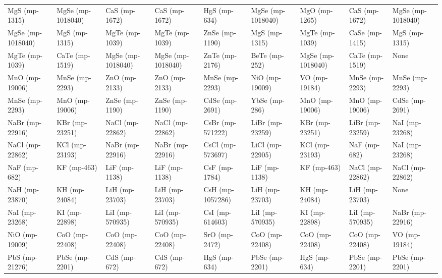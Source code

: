 \begin{longtable}{lllllllll}
    MgS (mp-1315) & MgSe (mp-1018040) &       CaS (mp-1672) &     CaS (mp-1672) &        HgS (mp-634) & MgSe (mp-1018040) &     MgO (mp-1265) &     CaS (mp-1672) & MgSe (mp-1018040) \\
MgSe (mp-1018040) &     MgS (mp-1315) &      MgTe (mp-1039) &    MgTe (mp-1039) &      ZnSe (mp-1190) &     MgS (mp-1315) &    MgTe (mp-1039) &    CaSe (mp-1415) &     MgS (mp-1315) \\
   MgTe (mp-1039) &    CaTe (mp-1519) &   MgSe (mp-1018040) & MgSe (mp-1018040) &      ZnTe (mp-2176) &     BeTe (mp-252) & MgSe (mp-1018040) &    CaTe (mp-1519) &              None \\
   MnO (mp-19006) &    MnSe (mp-2293) &       ZnO (mp-2133) &     ZnO (mp-2133) &      MnSe (mp-2293) &    NiO (mp-19009) &     VO (mp-19184) &    MnSe (mp-2293) &    MnSe (mp-2293) \\
   MnSe (mp-2293) &    MnO (mp-19006) &      ZnSe (mp-1190) &    ZnSe (mp-1190) &      CdSe (mp-2691) &     YbSe (mp-286) &    MnO (mp-19006) &    MnO (mp-19006) &    CdSe (mp-2691) \\
  NaBr (mp-22916) &    KBr (mp-23251) &     NaCl (mp-22862) &   NaCl (mp-22862) &    CsBr (mp-571222) &   LiBr (mp-23259) &    KBr (mp-23251) &   LiBr (mp-23259) &    NaI (mp-23268) \\
  NaCl (mp-22862) &    KCl (mp-23193) &     NaBr (mp-22916) &   NaBr (mp-22916) &    CsCl (mp-573697) &   LiCl (mp-22905) &    KCl (mp-23193) &      NaF (mp-682) &    NaI (mp-23268) \\
     NaF (mp-682) &       KF (mp-463) &       LiF (mp-1138) &     LiF (mp-1138) &       CsF (mp-1784) &     LiF (mp-1138) &       KF (mp-463) &   NaCl (mp-22862) &   NaCl (mp-22862) \\
   NaH (mp-23870) &     KH (mp-24084) &      LiH (mp-23703) &    LiH (mp-23703) &    CsH (mp-1057286) &    LiH (mp-23703) &     KH (mp-24084) &    LiH (mp-23703) &              None \\
   NaI (mp-23268) &     KI (mp-22898) &     LiI (mp-570935) &   LiI (mp-570935) &     CsI (mp-614603) &   LiI (mp-570935) &     KI (mp-22898) &   LiI (mp-570935) &   NaBr (mp-22916) \\
   NiO (mp-19009) &    CoO (mp-22408) &      CoO (mp-22408) &    CoO (mp-22408) &       SrO (mp-2472) &    CoO (mp-22408) &    CoO (mp-22408) &    CoO (mp-22408) &     VO (mp-19184) \\
   PbS (mp-21276) &    PbSe (mp-2201) &        CdS (mp-672) &      CdS (mp-672) &        HgS (mp-634) &    PbSe (mp-2201) &      HgS (mp-634) &    PbSe (mp-2201) &    PbSe (mp-2201) \\

\end{longtable}
